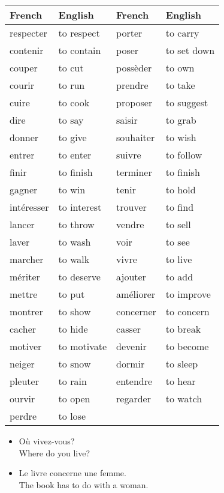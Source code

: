 \begin{center}\begin{tabular}{l|l||l|l}
\textbf{French} & \textbf{English} & \textbf{French} & \textbf{English} \\ \hline
respecter & to respect & porter & to carry \\ 
contenir & to contain & poser & to set down \\ 
couper & to cut & poss{\`e}der & to own \\ 
courir & to run & prendre & to take \\ 
cuire & to cook & proposer & to suggest \\ 
dire & to say & saisir & to grab \\ 
donner & to give & souhaiter & to wish \\ 
entrer & to enter & suivre & to follow \\ 
finir & to finish & terminer & to finish \\ 
gagner & to win & tenir & to hold \\ 
int{\'e}resser & to interest & trouver & to find \\ 
lancer & to throw & vendre & to sell \\ 
laver & to wash & voir & to see \\ 
marcher & to walk & vivre & to live \\ 
m{\'e}riter & to deserve & ajouter & to add \\ 
mettre & to put & am{\'e}liorer & to improve \\ 
montrer & to show & concerner & to concern \\ 
cacher & to hide & casser & to break \\ 
motiver & to motivate & devenir & to become \\ 
neiger & to snow & dormir & to sleep \\ 
pleuter & to rain & entendre & to hear \\ 
ourvir & to open & regarder & to watch \\ 
perdre & to lose \\
\end{tabular}\end{center}

\begin{itemize}
  \item  O{\`u} vivez-vous? \\ Where do you live?
  \item  Le livre concerne une femme. \\ The book has to do with a woman.
\end{itemize}



